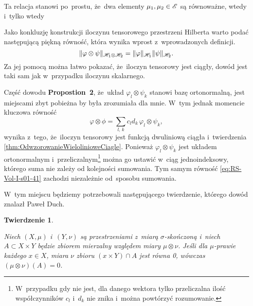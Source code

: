 \documentclass[a4paper,11pt]{article}
\newtheorem{theorem}{Twierdzenie} %
\begin{document}
Ta relacja stanowi po~prostu, że~dwa elementy
$\mu_{ 1 }, \mu_{ 2 } \in \mathcal{E}$ są równoważne, wtedy i~tylko wtedy

\vspace{\spaceFour}



\start {} Jako konkluzję konstrukcji iloczynu tensorowego
przestrzeni Hilberta warto podać następującą piękną równość, która
wynika wprost z~wprowadzonych definicji.
\begin{equation}
  \label{eq:RS-Vol-I-s01-40}
  \lVert{  \varphi \otimes \psi  }\rVert_{ \mathcal{H}_{ 1 } \otimes \mathcal{H}_{ 2 } }
  = \lVert{  \varphi  }\rVert_{ \mathcal{H}_{ 1 } } \lVert{  \psi  }\rVert_{ \mathcal{H}_{ 2 } }.
\end{equation}
Za jej pomocą można łatwo pokazać, że~iloczyn tensorowy jest ciągły,
dowód jest taki sam jak w~przypadku iloczynu skalarnego. %

\vspace{\spaceFour}



\start {} Część dowodu \textbf{Propostion~2}, że~układ
$\varphi_{ l } \otimes \psi_{ k }$ stanowi bazę ortonormalną, jest miejscami
zbyt pobieżna by była zrozumiała dla mnie. W~tym jednak momencie
kluczowa równość
\begin{equation}
  \label{eq:RS-Vol-I-s01-41}
  \varphi \otimes \phi = \sum_{ l,\, k } c_{ l } d_{ k }\, \varphi_{ l } \otimes \psi_{ k },
\end{equation}
wynika z~tego, że~iloczyn tensorowy jest funkcją dwuliniową ciągła
i~twierdzenia \eqref{thm:OdwzorowanieWielolinioweCiagle}. Ponieważ
$\varphi_{ l } \otimes \psi_{ k }$ jest układem ortonormalnym
i~przeliczalnym\footnote{W~przypadku gdy nie jest, dla danego wektora
  tylko przeliczalna ilość współczynników $c_{ l }$ i~$d_{ k }$ nie
  znika i~można powtórzyć rozumowanie.} można go ustawić w~ciąg
jednoindeksowy, którego suma nie zależy od kolejności sumowania. Tym
samym równość \eqref{eq:RS-Vol-I-s01-41} zachodzi niezależnie od~sposobu
sumowania.

\vspace{\spaceFour}



\start {} W~tym miejscu będziemy potrzebowali następującego
twierdzenie, którego dowód znalazł Paweł Duch.





\begin{theorem}
  \label{thm:TwierdzenieOIloczynieMiarPWZerowym}

  Niech $( X, \mu )$ i~$( Y, \nu )$ są przestrzeniami z~miarą
  $\sigma$-skończoną i~niech $A \subset X \times Y$ będzie zbiorem
  mierzalny względem miary $\mu \otimes \nu$. Jeśli dla $\mu$-prawie
  każdego $x \in X$, miara $\nu$ zbioru $( x \times Y ) \cap A$ jest
  równa 0, wówczas $(\mu \otimes \nu)( A ) = 0$.

\end{theorem}
\end{document}
